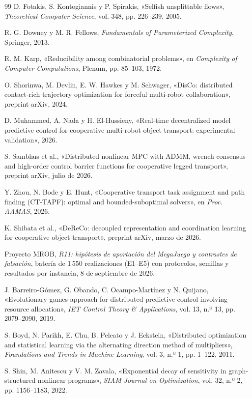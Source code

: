 \documentclass[11pt,a4paper]{article}
\theoremstyle{plain}
\theoremstyle{definition}
\theoremstyle{remark}
\begin{document}
\begin{thebibliography}{99}
D. Fotakis, S. Kontogiannis y P. Spirakis,
«Selfish unsplittable flows»,
\emph{Theoretical Computer Science}, vol. 348, pp. 226--239, 2005.

R. G. Downey y M. R. Fellows,
\emph{Fundamentals of Parameterized Complexity},
Springer, 2013.

R. M. Karp,
«Reducibility among combinatorial problems»,
en \emph{Complexity of Computer Computations}, Plenum, pp. 85--103, 1972.

O. Shorinwa, M. Devlin, E. W. Hawkes y M. Schwager,
«DisCo: distributed contact-rich trajectory optimization for forceful multi-robot collaboration»,
preprint arXiv, 2024.

D. Muhammed, A. Nada y H. El-Hussieny,
«Real-time decentralized model predictive control for cooperative multi-robot object transport: experimental validation»,
2026.

S. Sambhus et al.,
«Distributed nonlinear MPC with ADMM, wrench consensus and high-order control barrier functions for cooperative legged transport»,
preprint arXiv, julio de 2026.

Y. Zhou, N. Bode y E. Hunt,
«Cooperative transport task assignment and path finding (CT-TAPF): optimal and bounded-suboptimal solvers»,
en \emph{Proc. AAMAS}, 2026.

K. Shibata et al.,
«DeReCo: decoupled representation and coordination learning for cooperative object transport»,
preprint arXiv, marzo de 2026.

Proyecto MROB,
\emph{R11: hipótesis de aportación del MegaJuego y contrastes de falsación},
batería de 1\,550 realizaciones (E1--E5) con protocolos, semillas y resultados por instancia, 8 de septiembre de 2026.

J. Barreiro-Gómez, G. Obando, C. Ocampo-Martínez y N. Quijano,
«Evolutionary-games approach for distributed predictive control involving resource allocation»,
\emph{IET Control Theory \& Applications}, vol. 13, n.º 13, pp. 2079--2090, 2019.

S. Boyd, N. Parikh, E. Chu, B. Peleato y J. Eckstein,
«Distributed optimization and statistical learning via the alternating direction method of multipliers»,
\emph{Foundations and Trends in Machine Learning}, vol. 3, n.º 1, pp. 1--122, 2011.

S. Shin, M. Anitescu y V. M. Zavala,
«Exponential decay of sensitivity in graph-structured nonlinear programs»,
\emph{SIAM Journal on Optimization}, vol. 32, n.º 2, pp. 1156--1183, 2022.

\end{thebibliography}
\end{document}
